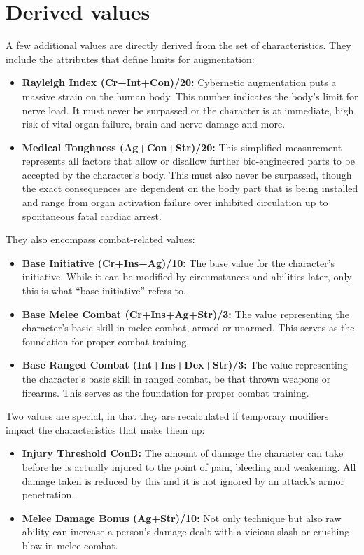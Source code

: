 \documentclass[12pt,a4paper]{book}
\begin{document}
	\section{Derived values}
	A few additional values are directly derived from the set of characteristics. They include the attributes that define limits for augmentation:
	\begin{itemize}
		\setlength\itemsep{-8mm}
		\item \textbf{Rayleigh Index \textlangle(Cr+Int+Con)/20\textrangle:} Cybernetic augmentation puts a massive strain on the human body. This number indicates the body’s limit for nerve load. It must never be surpassed or the character is at immediate, high risk of vital organ failure, brain and nerve damage and more.
		\item \textbf{Medical Toughness \textlangle(Ag+Con+Str)/20\textrangle:} This simplified measurement represents all factors that allow or disallow further bio-engineered parts to be accepted by the character’s body. This must also never be surpassed, though the exact consequences are dependent on the body part that is being installed and range from organ activation failure over inhibited circulation up to spontaneous fatal cardiac arrest.
	\end{itemize}
	
	They also encompass combat-related values:
	\begin{itemize}
		\setlength\itemsep{-8mm}
		\item \textbf{Base Initiative \textlangle(Cr+Ins+Ag)/10\textrangle:} The base value for the character’s initiative. While it can be modified by circumstances and abilities later, only this is what “base initiative” refers to.
		\item \textbf{Base Melee Combat \textlangle(Cr+Ins+Ag+Str)/3\textrangle:} The value representing the character’s basic skill in melee combat, armed or unarmed. This serves as the foundation for proper combat training.
		\item \textbf{Base Ranged Combat \textlangle(Int+Ins+Dex+Str)/3\textrangle:} The value representing the character’s basic skill in ranged combat, be that thrown weapons or firearms. This serves as the foundation for proper combat training.
	\end{itemize}

	Two values are special, in that they are recalculated if temporary modifiers impact the characteristics that make them up:
	\begin{itemize}
		\setlength\itemsep{-8mm}
		\item \textbf{Injury Threshold \textlangle ConB\textrangle:} The amount of damage the character can take before he is actually injured to the point of pain, bleeding and weakening. All damage taken is reduced by this and it is not ignored by an attack’s armor penetration.
		\item \textbf{Melee Damage Bonus \textlangle(Ag+Str)/10\textrangle:} Not only technique but also raw ability can increase a person’s damage dealt with a vicious slash or crushing blow in melee combat.
	\end{itemize}
\end{document}
